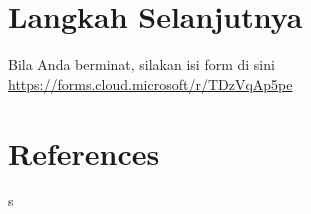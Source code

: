 \documentclass[
  letterpaper,
  DIV=11,
  numbers=noendperiod]{scrreprt}
\begin{document}

\chapter{Langkah Selanjutnya}\label{langkah-selanjutnya}

Bila Anda berminat, silakan isi form di sini
\url{https://forms.cloud.microsoft/r/TDzVqAp5pe}


\chapter*{References}\label{references}


s
\end{document}
